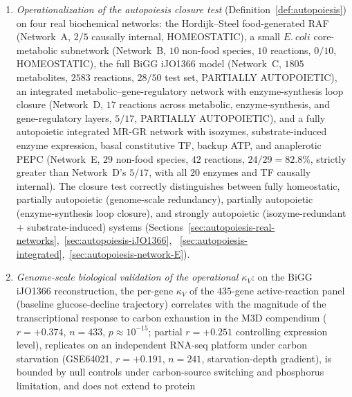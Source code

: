 \documentclass[11pt,a4paper]{article}
\theoremstyle{plain}
\theoremstyle{definition}
\theoremstyle{remark}
\newcommand{\kk}{\kappa_{\!V}}
\newcommand{\colim}{\operatorname{colim}}
\begin{document}
\begin{enumerate}[leftmargin=*,itemsep=2pt]
$\colim F=(\colim_{i}M_{i},\,\colim_{i}C_{i})$, with the universal
cocone optic $F(i)\to\colim F$ having residual
$R_{i}=\colim_{(i\to j)\in(i\downarrow\mathbb I)}R_{ij}$ (colimit over
the comma category of arrows out of $i$). Well-definedness uses that
$\mathbf{Set}$ is locally finitely presentable (filtered colimits
commute with finite limits) and the optic composition
law~\cite{riley2018optics} (Theorem~\ref{thm:filtered-colimits-optic}).
This closes Conjecture~\ref{conj:filtered-colimits-optic}.
\item \emph{Operationalization of the autopoiesis closure test}
(Definition~\ref{def:autopoiesis}) on four real biochemical networks:
the Hordijk--Steel food-generated RAF (Network~A, $2/5$ causally
internal, HOMEOSTATIC), a small $E.~coli$ core-metabolic subnetwork
(Network~B, $10$ non-food species, $10$ reactions, $0/10$, HOMEOSTATIC),
the full BiGG iJO1366 model (Network~C, $1805$ metabolites, $2583$
reactions, $28/50$ test set, PARTIALLY AUTOPOIETIC), an integrated
metabolic--gene-regulatory network with enzyme-synthesis loop closure
(Network~D, $17$ reactions across metabolic, enzyme-synthesis, and
gene-regulatory layers, $5/17$, PARTIALLY AUTOPOIETIC), and a fully
autopoietic integrated MR-GR network with isozymes, substrate-induced
enzyme expression, basal constitutive TF, backup ATP, and anaplerotic
PEPC (Network~E, $29$ non-food species, $42$ reactions, $24/29 = 82.8\%$,
strictly greater than Network~D's $5/17$, with all $20$ enzymes and TF
causally internal). The closure test correctly distinguishes between
fully homeostatic, partially autopoietic (genome-scale redundancy),
partially autopoietic (enzyme-synthesis loop closure), and strongly
autopoietic (isozyme-redundant + substrate-induced) systems
(Sections~\ref{sec:autopoiesis-real-networks},~\ref{sec:autopoiesis-iJO1366},
~\ref{sec:autopoiesis-integrated},~\ref{sec:autopoiesis-network-E}).
\item \emph{Genome-scale biological validation of the operational
$\kk$}: on the BiGG iJO1366 reconstruction, the per-gene $\kk$ of the
$435$-gene active-reaction panel (baseline glucose-decline trajectory)
correlates with the magnitude of the transcriptional response to
carbon exhaustion in the M3D compendium ($r = +0.374$, $n = 433$,
$p \approx 10^{-15}$; partial $r = +0.251$ controlling expression
level), replicates on an independent RNA-seq platform under carbon
starvation (GSE64021, $r = +0.191$, $n = 241$, starvation-depth
gradient), is bounded by null controls under carbon-source switching
and phosphorus limitation, and does not extend to protein

\end{enumerate}
\end{document}
